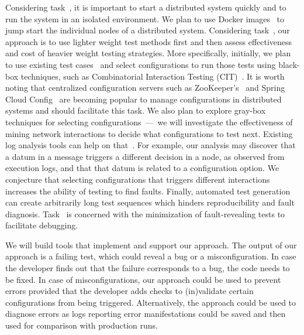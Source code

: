 \documentclass[11pt]{article}
\newcommand{\Comment}[1]{}
\begin{document}
\vspace{1ex} Considering task~\taskvirtualization{}, it is important
to start a distributed system quickly and to run the system in an
isolated environment. We plan to use Docker images~\cite{docker} to
jump start the individual nodes of a distributed system. Considering
task~\taskteststrategies{}, our approach is to use lighter weight test
methods first and then assess effectiveness and cost of heavier weight
testing strategies.  More specifically, initially, we plan to use
existing test cases~\cite{maddox-2015-acmqueue} and select
configurations to run those tests using black-box techniques, such as
Combinatorial Interaction Testing
(CIT)~\cite{nie-leung-acm-surveys2011}.  It is worth noting that
centralized configuration servers such as
ZooKeeper's~\cite{apache-zookeeper} and Spring Cloud
Config~\cite{spring-cloud-config} are becoming popular to manage
configurations in distributed systems and should facilitate this task.
We also plan to explore gray-box techniques for selecting
configurations~---~we will investigate the effectiveness of mining
network interactions to decide what configurations to test
next. Existing log analysis tools can help on
that~\cite{mace-etal-usenix2016}. For example, our analysis may
discover that a datum in a message triggers a different decision in a
node, as observed from execution logs, and that that datum is related
to a configuration option. We conjecture that selecting configurations
that triggers different interactions increases the ability of testing
to find faults. Finally, automated test generation can create
arbitrarily long test sequences which hinders reproducibility and
fault diagnosis.  Task~\idminimization{} is concerned with the
minimization of fault-revealing tests to facilitate debugging.


We will build tools that implement and support our approach.  The
output of our approach is a failing test, which could reveal a bug or
a misconfiguration. In case the developer finds out that the failure
corresponds to a bug, the code needs to be fixed.  In case of
misconfigurations, our approach could be used to prevent errors
provided that the developer adds checks to (in)validate certain
configurations from being triggered.  Alternatively, the approach
could be used to diagnose errors as logs reporting error
manifestations could be saved and then used for comparison with
production runs.
\end{document}
